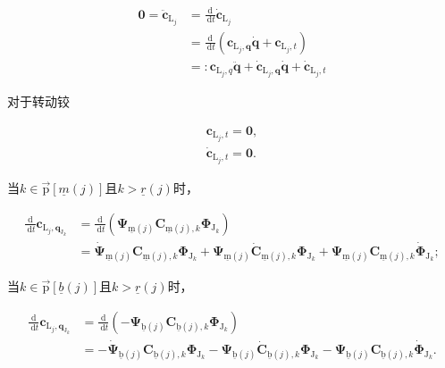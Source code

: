 \[
\begin{aligned}
\mathbf{0}=\ddot{\boldsymbol{c}}_{\mathrm{L}_{j}} & =\frac{\mathrm{d}}{\mathrm{~d} t} \dot{\boldsymbol{c}}_{\mathrm{L}_{j}} \\
& =\frac{\mathrm{d}}{\mathrm{~d} t}\left(\boldsymbol{c}_{\mathrm{L}_{j}, \boldsymbol{q}} \dot{\boldsymbol{q}}+\boldsymbol{c}_{\mathrm{L}_{j}, t}\right) \\
& =: \boldsymbol{c}_{\mathrm{L}_{j}, q} \ddot{\boldsymbol{q}}+\dot{\boldsymbol{c}}_{\mathrm{L}_{j}, \boldsymbol{q}} \dot{\boldsymbol{q}}+\dot{\boldsymbol{c}}_{\mathrm{L}_{j}, t}
\end{aligned}
\]

对于转动铰

\[
\begin{array}{l}
\boldsymbol{c}_{\mathrm{L}_{j}, t}=\mathbf{0}, \\
\dot{\boldsymbol{c}}_{\mathrm{L}_{j}, t}=\mathbf{0} .
\end{array}
\]

当$k\in \vec{\mathrm{p}}[\underline{m}(j)]$且$k>\underline{r}(j)$时，

\[
\begin{aligned}
\frac{\mathrm{d}}{\mathrm{~d} t} \boldsymbol{c}_{\mathrm{L}_{j}, \boldsymbol{q}_{\mathrm{J}_{k}}} & =\frac{\mathrm{d}}{\mathrm{~d} t}\left(\boldsymbol{\Psi}_{\underline{\mathrm{m}}(j)} \boldsymbol{C}_{\underline{\mathrm{m}}(j), k} \boldsymbol{\Phi}_{\mathrm{J}_{k}}\right) \\
& =\dot{\boldsymbol{\Psi}}_{\underline{\mathrm{m}}(j)} \boldsymbol{C}_{\underline{\mathrm{m}}(j), k} \boldsymbol{\Phi}_{\mathrm{J}_{k}}+\boldsymbol{\Psi}_{\underline{\mathrm{m}}(j)} \dot{\boldsymbol{C}}_{\underline{\mathrm{m}}(j), k} \boldsymbol{\Phi}_{\mathrm{J}_{k}}+\boldsymbol{\Psi}_{\underline{\mathrm{m}}(j)} \boldsymbol{C}_{\underline{\mathrm{m}}(j), k} \dot{\boldsymbol{\Phi}}_{\mathrm{J}_{k}} ;
\end{aligned}
\]

当$k\in \vec{\mathrm{p}}[\underline{b}(j)]$且$k>\underline{r}(j)$时，

\[
\begin{aligned}
\frac{\mathrm{d}}{\mathrm{~d} t} \boldsymbol{c}_{\mathrm{L}_{j}, \boldsymbol{q}_{\mathrm{J}_{k}}} & =\frac{\mathrm{d}}{\mathrm{~d} t}\left(-\boldsymbol{\Psi}_{\underline{\mathrm{b}}(j)} \boldsymbol{C}_{\underline{\mathrm{b}}(j), k} \boldsymbol{\Phi}_{\mathrm{J}_{k}}\right) \\
& =-\dot{\boldsymbol{\Psi}}_{\underline{\mathrm{b}}(j)} \boldsymbol{C}_{\underline{\mathrm{b}}(j), k} \boldsymbol{\Phi}_{\mathrm{J}_{k}}-\boldsymbol{\Psi}_{\underline{\mathrm{b}}(j)} \dot{\boldsymbol{C}}_{\underline{\mathrm{b}}(j), k} \boldsymbol{\Phi}_{\mathrm{J}_{k}}-\boldsymbol{\Psi}_{\underline{\mathrm{b}}(j)} \boldsymbol{C}_{\underline{\mathrm{b}}(j), k} \dot{\boldsymbol{\Phi}}_{\mathrm{J}_{k}} .
\end{aligned}
\]
